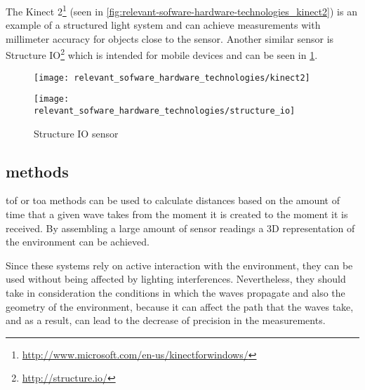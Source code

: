 The Kinect 2\footnote{\url{http://www.microsoft.com/en-us/kinectforwindows/}} (seen in \cref{fig:relevant-sofware-hardware-technologies_kinect2}) is an example of a structured light system and can achieve measurements with millimeter accuracy for objects close to the sensor. Another similar sensor is Structure IO\footnote{\url{http://structure.io/}} which is intended for mobile devices and can be seen in \cref{fig:relevant-sofware-hardware-technologies_structure-io}.

\begin{savenotes}
\begin{figure}[H]
	\centering
	\begin{minipage}[h]{.47\textwidth}
		\centering
		\texttt{[image: relevant\_sofware\_hardware\_technologies/kinect2]}
		\caption[Kinect 2 sensor]{Kinect 2 sensor\protect\footnotemark}
		\label{fig:relevant-sofware-hardware-technologies_kinect2}
	\end{minipage}\hfill
	\begin{minipage}[h]{.47\textwidth}
		\centering
		\texttt{[image: relevant\_sofware\_hardware\_technologies/structure\_io]}
		\caption[Structure IO sensor]{Structure IO sensor\protect\footnotemark}
		\label{fig:relevant-sofware-hardware-technologies_structure-io}
	\end{minipage}
\end{figure}
\end{savenotes}



\subsection{ methods}\label{sec:relevant-sofware-hardware-technologies_tof-methods}

\gls{tof} or \gls{toa} methods can be used to calculate distances based on the amount of time that a given wave takes from the moment it is created to the moment it is received. By assembling a large amount of sensor readings a 3D representation of the environment can be achieved.

Since these systems rely on active interaction with the environment, they can be used without being affected by lighting interferences. Nevertheless, they should take in consideration the conditions in which the waves propagate and also the geometry of the environment, because it can affect the path that the waves take, and as a result, can lead to the decrease of precision in the measurements.


